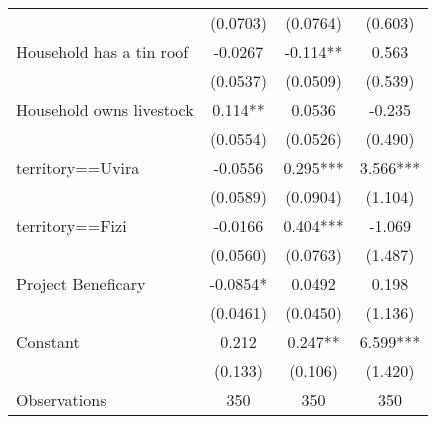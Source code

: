 {\begin{tabular}{l*{3}{c}}
                    &    (0.0703)   &    (0.0764)   &     (0.603)   \\
[1em]
Household has a tin roof&     -0.0267   &      -0.114** &       0.563   \\
                    &    (0.0537)   &    (0.0509)   &     (0.539)   \\
[1em]
Household owns livestock&       0.114** &      0.0536   &      -0.235   \\
                    &    (0.0554)   &    (0.0526)   &     (0.490)   \\
[1em]
territory==Uvira    &     -0.0556   &       0.295***&       3.566***\\
                    &    (0.0589)   &    (0.0904)   &     (1.104)   \\
[1em]
territory==Fizi     &     -0.0166   &       0.404***&      -1.069   \\
                    &    (0.0560)   &    (0.0763)   &     (1.487)   \\
[1em]
Project Beneficary  &     -0.0854*  &      0.0492   &       0.198   \\
                    &    (0.0461)   &    (0.0450)   &     (1.136)   \\
[1em]
Constant            &       0.212   &       0.247** &       6.599***\\
                    &     (0.133)   &     (0.106)   &     (1.420)   \\
\hline
Observations        &         350   &         350   &         350   \\
\hline\hline
\end{tabular}
}
